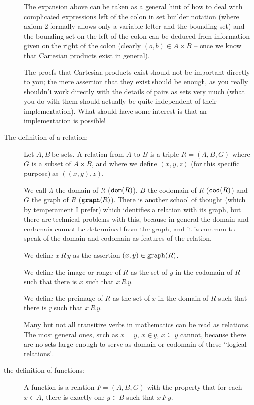 \documentclass[12pt]{article}
\begin{document}
\begin{description}
The expansion above can be taken as a general hint of how to deal with complicated expressions left of the colon in set builder notation (where axiom 2 formally allows
only a variable letter and the bounding set) and the bounding set on the left of the colon can be deduced from information given on the right of the colon (clearly $(a,b) \in A \times B$ -- once we know that Cartesian products exist in general).

The proofs that Cartesian products exist should not be important directly to you;  the mere assertion that they exist should be enough, as you really shouldn't work directly with the details of pairs as sets very much (what you do with them should actually be quite independent of their implementation).  What should have some interest is that an implementation is possible!

\item[The definition of a relation:]

Let $A,B$ be sets.  A relation from $A$ to $B$ is a triple $R=(A,B,G)$ where $G$ is a subset of $A \times B$, and where we define $(x,y,z)$ (for this specific purpose) as $((x,y),z)$.

We call $A$ the domain of $R$ (${\tt dom}(R)$), $B$ the codomain of $R$ (${\tt cod}(R)$) and $G$ the graph of $R$ (${\tt graph}(R)$).   There is another school of thought
(which by temperament I prefer) which identifies a relation with its graph, but there are technical problems with this, because in general the domain and codomain cannot be determined from the graph, and it is common to speak of the domain and codomain as features of the relation.

We define $x \,R\, y$ as the assertion $(x,y) \in {\tt graph}(R)$.

We define the image or range of $R$ as the set of $y$ in the codomain of $R$ such that there is $x$ such that $x \, R \, y$.

We define the preimage of $R$ as the set of $x$ in the domain of $R$ such that there is $y$ such that $x \, R \, y$.

Many but not all transitive verbs in mathematics can be read as relations.  The most general ones, such
as $x = y$, $x \in y$, $x \subseteq y$ cannot, because there are no sets large enough to serve as domain or codomain of these ``logical relations".

\item[the definition of functions:]

A function is a relation $F = (A,B,G)$ with the property that for each $x \in A$, there is exactly one $y \in B$ such that $x \, F \, y$.


\end{description}
\end{document}
